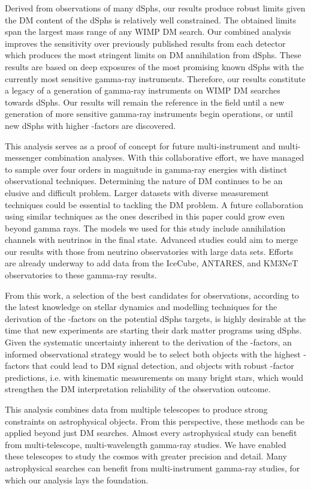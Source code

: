 Derived from observations of many dSphs, our results produce robust limits given the DM content of the dSphs is relatively well constrained.
The obtained limits span the largest mass range of any WIMP DM search.
Our combined analysis improves the sensitivity over previously published results from each detector which produces the most stringent limits on DM annihilation from dSphs.
These results are based on deep exposures of the most promising known dSphs with the currently most sensitive gamma-ray instruments.
Therefore, our results constitute a legacy of a generation of gamma-ray instruments on WIMP DM searches towards dSphs.
Our results will remain the reference in the field until a new generation of more sensitive gamma-ray instruments begin operations, or until new dSphs with higher \J-factors are discovered.

This analysis serves as a proof of concept for future multi-instrument and multi-messenger combination analyses.
With this collaborative effort, we have managed to sample over four orders in magnitude in gamma-ray energies with distinct observational techniques.
Determining the nature of DM continues to be an elusive and difficult problem.
Larger datasets with diverse measurement techniques could be essential to tackling the DM problem.
A future collaboration using similar techniques as the ones described in this paper could grow even beyond gamma rays.
The models we used for this study include annihilation channels with neutrinos in the final state.
Advanced studies could aim to merge our results with those from neutrino observatories with large data sets.
Efforts are already underway to add data from the IceCube, ANTARES, and KM3NeT observatories to these gamma-ray results.

From this work, a selection of the best candidates for observations, according to the latest knowledge on stellar dynamics and modelling techniques for the derivation of the \J-factors on the potential dSphs targets, is highly desirable at the time that new experiments are starting their dark matter programs using dSphs.
Given the systematic uncertainty inherent to the derivation of the \J-factors,
an informed observational strategy would be to select both objects with the highest \J-factors that could lead to DM signal detection, and objects with robust \J-factor predictions, i.e. with kinematic measurements on many bright stars, which would strengthen the DM interpretation reliability of the observation outcome.

This analysis combines data from multiple telescopes to produce strong constraints on astrophysical objects.
From this perspective, these methods can be applied beyond just DM searches.
Almost every astrophysical study can benefit from multi-telescope, multi-wavelength gamma-ray studies.
We have enabled these telescopes to study the cosmos with greater precision and detail.
Many astrophysical searches can benefit from multi-instrument gamma-ray studies, for which our analysis lays the foundation.